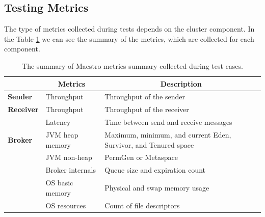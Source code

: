 


\subsection{Testing Metrics}
\label{Testing Metrics}
The type of metrics collected during tests depends on the cluster component. In the Table \ref{tab:maestro_metrics} we can see the summary of the metrics, which are collected for each component.

\begingroup
\setlength{\tabcolsep}{10pt} %
\renewcommand{\arraystretch}{1.35} %
	\begin{table}[H]
	\centering
	\begin{tabular}{|p{2.5cm}|p{3.5cm}|p{7cm}|}
	\hline
	\rowcolor[HTML]{C5E3DF}
	\multicolumn{1}{|c|}{\textbf{Component}} & \multicolumn{1}{c|}{\textbf{Metrics}} & \multicolumn{1}{c|}{\textbf{Description}}                       \\ \hline
	\textbf{Sender}                          & Throughput                            & Throughput of the sender                                        \\ \hline
	\textbf{Receiver}                        & Throughput                            & Throughput of the receiver                                      \\ \hline
	\textbf{}                                & Latency                               & Time between send and receive messages                           \\ \hline
	\textbf{Broker}			                & JVM heap memory                       & Maximum, minimum, and current Eden, Survivor, and Tenured space\footnotemark{} \\ \hline
	                                         & JVM non-heap                          & PermGen or Metaspace                                            \\ \hline
	                                         & Broker internals                      & Queue size and expiration count                                 \\ \hline
	                                         & OS basic memory                       & Physical and swap memory usage                                  \\ \hline
	                                         & OS resources                          & Count of file descriptors                                       \\ \hline
	\end{tabular}
	\caption{The summary of Maestro metrics summary collected during test cases.}
	\label{tab:maestro_metrics}
	\end{table}
\endgroup

